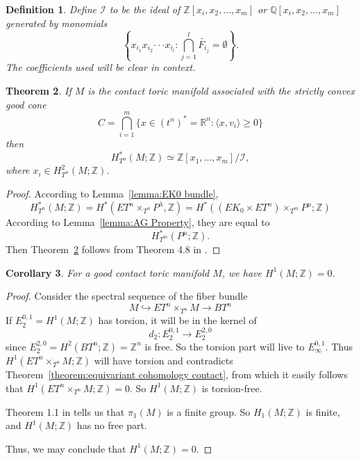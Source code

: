 \documentclass[12pt]{amsart}
\newtheorem{theorem}{Theorem}[section]
\newtheorem{corollary}[theorem]{Corollary}
\newtheorem{definition}[theorem]{Definition}
\theoremstyle{definition}
\numberwithin{equation}{section}
\begin{document}
\begin{definition}\label{def:I}
Define ${{\mathcal{I}}}$ to be the ideal of ${{\mathbb{Z}}}[x_{i},x_{2},...,x_{m}]$ or
${{\mathbb{Q}}}[x_{i},x_{2},...,x_{m}]$ generated by monomials
\begin{equation*}\left\{x_{i_{1}}x_{i_{2}}{{\cdot\cdot\cdot}} x_{i_{l}}:
\bigcap_{j=1}^{l}\widetilde{F_{i_{j}}}=\emptyset\right\}.\end{equation*}
The coefficients used will be clear in context.
\end{definition}

\begin{theorem}\label{theorem:equivariant cohomology contact}
 If $M$ is the contact toric manifold associated with the strictly convex good cone \[C= \bigcap_{i=1}^{m}\{x\in
(t^{n})^{*}={{\mathbb{R}}}^n: \langle x, v_{i}\rangle \geq 0\}\] then
\[H_{T^n}^{*}(M;{{\mathbb{Z}}})\simeq {{\mathbb{Z}}}[x_{1},...,x_{m}]/{{\mathcal{I}}},\]
where $x_{i}\in H^{2}_{T^n}(M;{{\mathbb{Z}}})$.
\end{theorem}
\begin{proof} According to Lemma~\ref{lemma:EK0 bundle},\[H_{T^n}^{*}(M;{{\mathbb{Z}}})=H^{*}(ET^n\times_{T^n} P^{\lambda},{{\mathbb{Z}}})=
H^{*}((EK_{0}\times ET^n)\times_{T^m}P^{\mu};{{\mathbb{Z}}})\]
 According to Lemma~\ref{lemma:AG Property}, they are equal
to \[H_{T^m}^{*}(P^{\mu};{{\mathbb{Z}}}).\] Then
Theorem~\ref{theorem:equivariant cohomology contact} follows from
Theorem 4.8 in \cite{DJ}.
\end{proof}

\begin{corollary}\label{cor:H^1 of M}
For a good contact toric manifold $M$, we have $H^{1}(M;{{\mathbb{Z}}})=0$.
\end{corollary}
\begin{proof}
Consider the spectral sequence of the fiber bundle
\begin{equation}
M\hookrightarrow ET^n\times_{T^n}M \rightarrow BT^n
\end{equation}
If $E_{2}^{0,1}=H^{1}(M;{{\mathbb{Z}}})$ has torsion, it will be in the kernel
of
\begin{equation}
d_{2}: E_{2}^{0,1}\rightarrow E_{2}^{2,0}
\end{equation}
since $E_{2}^{2,0}=H^{2}(BT^n;{{\mathbb{Z}}})={{\mathbb{Z}}}^n$ is free. So the torsion part
will live to $E_{\infty}^{0,1}$. Thus $H^{1}(ET^n\times_{T^n}M;{{\mathbb{Z}}})$
will have torsion and contradicts Theorem~\ref{theorem:equivariant
cohomology contact}, from which it easily follows that
$H^{1}(ET^n\times_{T^n}M;{{\mathbb{Z}}})=0$.  So $H^{1}(M;{{\mathbb{Z}}})$ is torsion-free.

Theorem 1.1 in \cite{L:homotopy group} tells us that $\pi_{1}(M)$ is
a finite group. So $H_{1}(M;{{\mathbb{Z}}})$ is finite, and $H^{1}(M;{{\mathbb{Z}}})$ has no
free part.

Thus, we may conclude that $H^{1}(M;{{\mathbb{Z}}})=0$.
\end{proof}
\end{document}
